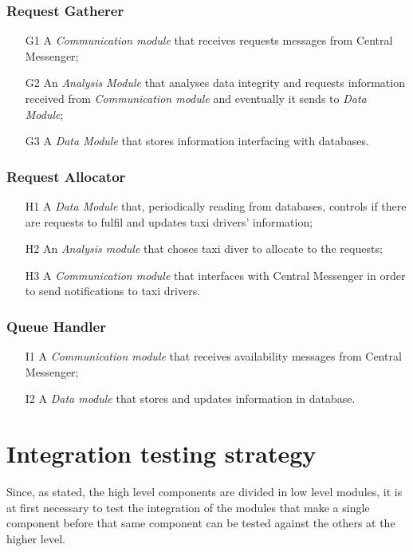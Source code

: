\subsubsection{Request Gatherer}
\begin{itemize}
\item [G1] A \emph{Communication module} that receives requests messages from Central Messenger;
\item [G2] An \emph{Analysis Module} that analyses data integrity and requests information received from \emph{Communication module} and eventually it sends to \emph{Data Module};
\item [G3] A \emph{Data Module} that stores information interfacing with databases.
\end{itemize}

\subsubsection{Request Allocator}
\begin{itemize}
\item [H1] A \emph{Data Module} that, periodically reading from databases, controls if there are requests to fulfil and updates taxi drivers’ information;
\item [H2] An \emph{Analysis module} that choses taxi diver to allocate to the requests;
\item [H3] A \emph{Communication module} that interfaces with Central Messenger in order to send notifications to taxi drivers.
\end{itemize}

\subsubsection{Queue Handler} 
\begin{itemize}
\item [I1] A \emph{Communication module} that receives availability messages from Central Messenger;
\item [I2] A \emph{Data module} that stores and updates information in database.
\end{itemize}


\section{Integration testing strategy}
Since, as stated, the high level components are divided in low level modules, it is at first necessary to test the integration of the modules that make a single component before that same component can be tested against the others at the higher level.

